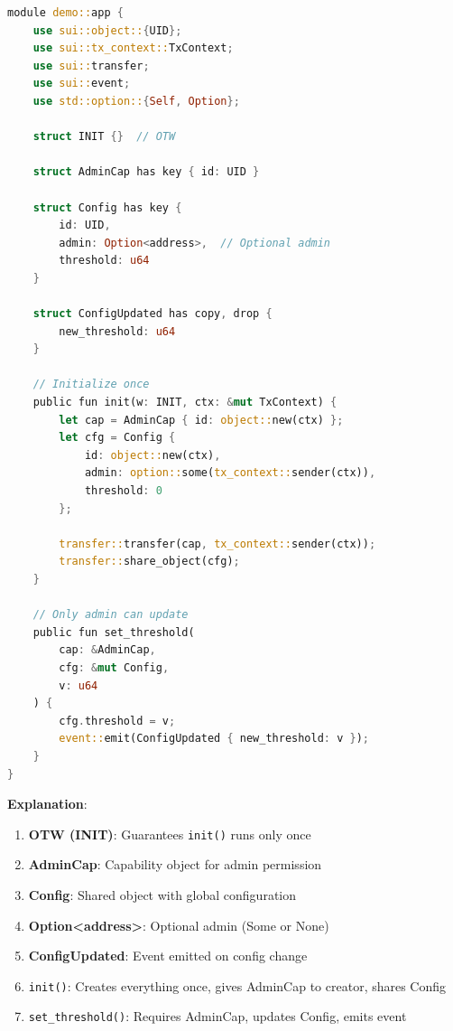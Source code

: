 \documentclass[11pt]{article}
\begin{document}
\begin{lstlisting}[language=Rust]
module demo::app {
    use sui::object::{UID};
    use sui::tx_context::TxContext;
    use sui::transfer;
    use sui::event;
    use std::option::{Self, Option};

    struct INIT {}  // OTW

    struct AdminCap has key { id: UID }

    struct Config has key {
        id: UID,
        admin: Option<address>,  // Optional admin
        threshold: u64
    }

    struct ConfigUpdated has copy, drop {
        new_threshold: u64
    }

    // Initialize once
    public fun init(w: INIT, ctx: &mut TxContext) {
        let cap = AdminCap { id: object::new(ctx) };
        let cfg = Config {
            id: object::new(ctx),
            admin: option::some(tx_context::sender(ctx)),
            threshold: 0
        };

        transfer::transfer(cap, tx_context::sender(ctx));
        transfer::share_object(cfg);
    }

    // Only admin can update
    public fun set_threshold(
        cap: &AdminCap,
        cfg: &mut Config,
        v: u64
    ) {
        cfg.threshold = v;
        event::emit(ConfigUpdated { new_threshold: v });
    }
}
\end{lstlisting}

\begin{noteBox}
\textbf{Explanation}:
\begin{enumerate}
  \item \textbf{OTW (INIT)}: Guarantees \texttt{init()} runs only once
  \item \textbf{AdminCap}: Capability object for admin permission
  \item \textbf{Config}: Shared object with global configuration
  \item \textbf{Option<address>}: Optional admin (Some or None)
  \item \textbf{ConfigUpdated}: Event emitted on config change
  \item \texttt{init()}: Creates everything once, gives AdminCap to creator, shares Config
  \item \texttt{set\_threshold()}: Requires AdminCap, updates Config, emits event
\end{enumerate}
\end{noteBox}

\end{document}
